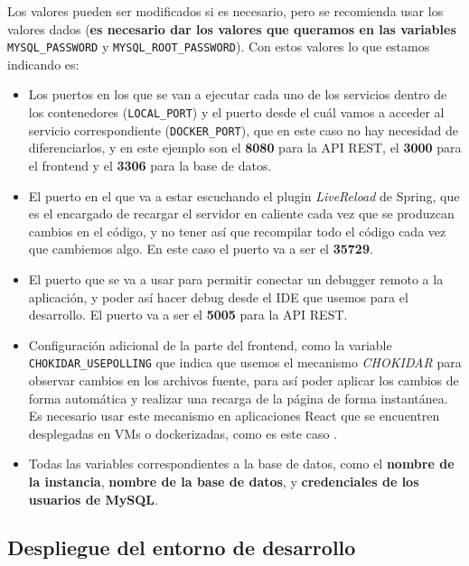 Los valores pueden ser modificados si es necesario, pero se recomienda usar los valores dados (\textbf{es necesario dar los valores que queramos en las variables} \verb,MYSQL_PASSWORD, y \verb,MYSQL_ROOT_PASSWORD,). Con estos valores lo que estamos indicando es:

\begin{itemize}
	\item Los puertos en los que se van a ejecutar cada uno de los servicios dentro de los contenedores (\verb,LOCAL_PORT,) y el puerto desde el cuál vamos a acceder al servicio correspondiente (\verb,DOCKER_PORT,), que en este caso no hay necesidad de diferenciarlos, y en este ejemplo son el \textbf{8080} para la API REST, el \textbf{3000} para el frontend y el \textbf{3306} para la base de datos.
	\item El puerto en el que va a estar escuchando el plugin \textit{LiveReload} de Spring, que es el encargado de recargar el servidor en caliente cada vez que se produzcan cambios en el código, y no tener así que recompilar todo el código cada vez que cambiemos algo. En este caso el puerto va a ser el \textbf{35729}.
	\item El puerto que se va a usar para permitir conectar un debugger remoto a la aplicación, y poder así hacer debug desde el IDE que usemos para el desarrollo. El puerto va a ser el \textbf{5005} para la API REST.
	\item Configuración adicional de la parte del frontend, como la variable \verb,CHOKIDAR_USEPOLLING, que indica que usemos el mecanismo \textit{CHOKIDAR} para observar cambios en los archivos fuente, para así poder aplicar los cambios de forma automática y realizar una recarga de la página de forma instantánea. Es necesario usar este mecanismo en aplicaciones React que se encuentren desplegadas en VMs o dockerizadas, como es este caso \cite{create-react-app:advanced-conf}.
	\item Todas las variables correspondientes a la base de datos, como el \textbf{nombre de la instancia}, \textbf{nombre de la base de datos}, y \textbf{credenciales de los usuarios de MySQL}.
\end{itemize}

\subsection{Despliegue del entorno de desarrollo}


